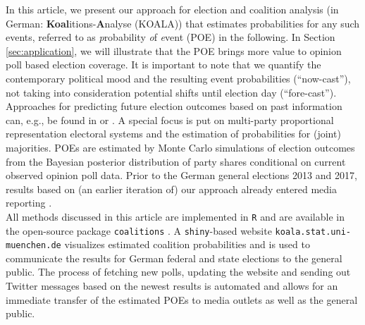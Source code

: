 \documentclass[smallextended]{svjour3}      %
\begin{document}
In this article, we present our approach for election and coalition analysis
(in German: \textbf{Koal}itions-\textbf{A}nalyse (KOALA)) that estimates probabilities
for any such events, referred to as \emph{p}robability \emph{o}f \emph{e}vent (POE)
in the following. In Section \ref{sec:application}, we will illustrate that the
POE brings more value to opinion poll based election coverage.
It is important to note that we quantify the contemporary political mood
and the resulting event probabilities (``now-cast''), not taking into consideration
potential shifts until election day (``fore-cast''). Approaches for predicting
future election outcomes based on past information can, e.g., be found in
\citet{graefe_2017} or \citet{norpoth_gschwend_2010}. A special focus is put on
multi-party proportional representation electoral systems and the estimation
of probabilities for (joint) majorities. POEs are estimated by Monte Carlo
simulations of election outcomes from the Bayesian posterior distribution of party
shares conditional on current observed opinion poll data. Prior to the German general
elections 2013 and 2017, results based on (an earlier iteration of) our approach
already entered media reporting \citep[cf.][]{wahlistik_2013, gelitz_2017}.\\

All methods discussed in this article are implemented in \texttt{R} \citep{r_2017}
and are available in the open-source package \texttt{coalitions} \citep{bender_bauer_2018}.
A \texttt{shiny}-based \citep{chang_2017} website
\texttt{koala.stat.uni-\allowbreak muenchen.\allowbreak de} visualizes estimated
coalition probabilities and is used to communicate the results for German federal
and state elections to the general public.
The process of fetching new polls,
updating the website and sending out Twitter messages based on the newest results
is automated and allows for an immediate transfer of the estimated POEs
to media outlets as well as the general public.
\end{document}
